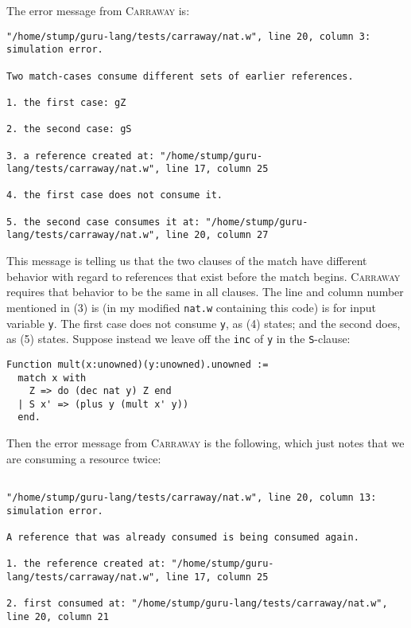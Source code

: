 \documentclass{book}[12pt]
\newcommand{\carraway}[0]{\textsc{Carraway}\xspace}
\begin{document}
\noindent The error message from \carraway is:

{\footnotesize
\begin{verbatim}
"/home/stump/guru-lang/tests/carraway/nat.w", line 20, column 3: simulation error.

Two match-cases consume different sets of earlier references.

1. the first case: gZ

2. the second case: gS

3. a reference created at: "/home/stump/guru-lang/tests/carraway/nat.w", line 17, column 25

4. the first case does not consume it.

5. the second case consumes it at: "/home/stump/guru-lang/tests/carraway/nat.w", line 20, column 27
\end{verbatim}
}

\noindent This message is telling us that the two clauses of the match
have different behavior with regard to references that exist before
the match begins.  \carraway requires that behavior to be the same in
all clauses.  The line and column number mentioned in (3) is (in my
modified \texttt{nat.w} containing this code) is for input variable
\texttt{y}.  The first case does not consume \texttt{y}, as (4)
states; and the second does, as (5) states.  Suppose instead we leave
off the \texttt{inc} of \texttt{y} in the \texttt{S}-clause:

\begin{verbatim}
Function mult(x:unowned)(y:unowned).unowned :=
  match x with
    Z => do (dec nat y) Z end
  | S x' => (plus y (mult x' y))
  end.
\end{verbatim}

\noindent Then the error message from \carraway is the following, which just notes that
we are consuming a resource twice:

{\footnotesize
\begin{verbatim}

"/home/stump/guru-lang/tests/carraway/nat.w", line 20, column 13: simulation error.

A reference that was already consumed is being consumed again.

1. the reference created at: "/home/stump/guru-lang/tests/carraway/nat.w", line 17, column 25

2. first consumed at: "/home/stump/guru-lang/tests/carraway/nat.w", line 20, column 21
\end{verbatim}
}
\end{document}
